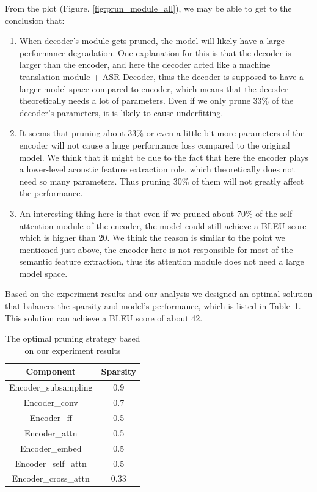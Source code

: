 \documentclass[11pt]{article}
\begin{document}
From the plot (Figure. \ref{fig:prun_module_all}), we may be able to get to the conclusion that:
\begin{enumerate}
    \item When decoder’s module gets pruned, the model will likely have a large performance degradation. One explanation for this is that the decoder is larger than the encoder, and here the decoder acted like a machine translation module + ASR Decoder, thus the decoder is supposed to have a larger model space compared to encoder, which means that the decoder theoretically needs a lot of parameters. Even if we only prune 33\% of the decoder’s parameters, it is likely to cause underfitting.
    \item It seems that pruning about 33\% or even a little bit more parameters of the encoder will not cause a huge performance loss compared to the original model. We think that it might be due to the fact that here the encoder plays a lower-level acoustic feature extraction role, which theoretically does not need so many parameters. Thus pruning 30\% of them will not greatly affect the performance.
    \item An interesting thing here is that even if we pruned about 70\% of the self-attention module of the encoder, the model could still achieve a BLEU score which is higher than 20. We think the reason is similar to the point we mentioned just above, the encoder here is not responsible for most of the semantic feature extraction, thus its attention module does not need a large model space.
\end{enumerate}
Based on the experiment results and our analysis we designed an optimal solution that balances the sparsity and model’s performance, which is listed in Table~\ref{tab:pruning_config}.
This solution can achieve a BLEU score of about 42.

\begin{table}[h!]
\centering
\begin{tabular}{cc}
Component & Sparsity \\ \hline
Encoder\_subsampling    & 0.9    \\
Encoder\_conv & 0.7 \\
Encoder\_ff & 0.5 \\
Encoder\_attn & 0.5 \\
Encoder\_embed & 0.5 \\
Encoder\_self\_attn & 0.5 \\
Encoder\_cross\_attn & 0.33 \\
\end{tabular}
\caption{The optimal pruning strategy based on our experiment results}
\label{tab:pruning_config}
\end{table}
\end{document}
